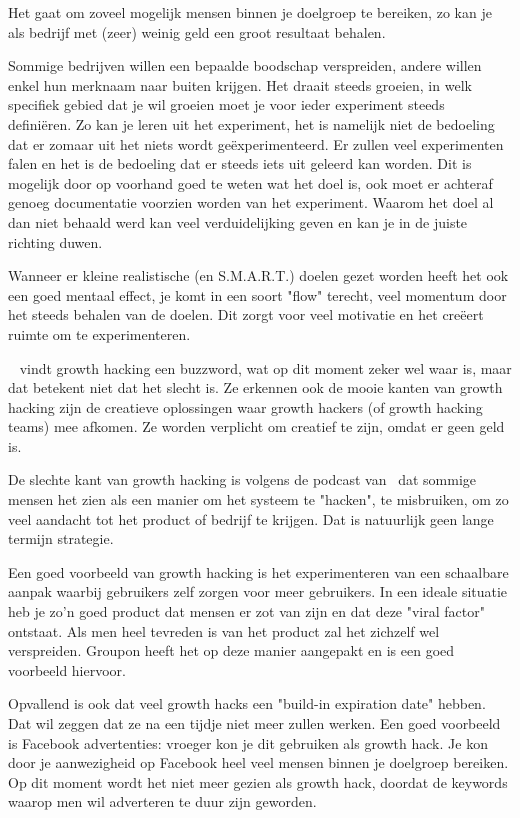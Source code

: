 Het gaat om zoveel mogelijk mensen binnen je doelgroep te bereiken, zo kan je als bedrijf met (zeer) weinig geld een groot resultaat behalen. 

Sommige bedrijven willen een bepaalde boodschap verspreiden, andere willen enkel hun merknaam naar buiten krijgen. Het draait steeds groeien, in welk specifiek gebied dat je wil groeien moet je voor ieder experiment steeds definiëren. Zo kan je leren uit het experiment, het is namelijk niet de bedoeling dat er zomaar uit het niets wordt geëxperimenteerd. Er zullen veel experimenten falen en het is de bedoeling dat er steeds iets uit geleerd kan worden. Dit is mogelijk door op voorhand goed te weten wat het doel is, ook moet er achteraf genoeg documentatie voorzien worden van het experiment. Waarom het doel al dan niet behaald werd kan veel verduidelijking geven en kan je in de juiste richting duwen.

Wanneer er kleine realistische (en S.M.A.R.T.) doelen gezet worden heeft het ook een goed mentaal effect, je komt in een soort "flow" terecht, veel momentum door het steeds behalen van de doelen. Dit zorgt voor veel motivatie en het creëert ruimte om te experimenteren.

~\textcite{fizzle.co2015} vindt growth hacking een buzzword, wat op dit moment zeker wel waar is, maar dat betekent niet dat het slecht is. Ze erkennen ook de mooie kanten van growth hacking zijn de creatieve oplossingen waar growth hackers (of growth hacking teams) mee afkomen. Ze worden verplicht om creatief te zijn, omdat er geen geld is. 

De slechte kant van growth hacking is volgens de podcast van~\autocite{fizzle.co2015} dat sommige mensen het zien als een manier om het systeem te "hacken", te misbruiken, om zo veel aandacht tot het product of bedrijf te krijgen. Dat is natuurlijk geen lange termijn strategie.

Een goed voorbeeld van growth hacking is het experimenteren van een schaalbare aanpak waarbij gebruikers zelf zorgen voor meer gebruikers. In een ideale situatie heb je zo'n goed product dat mensen er zot van zijn en dat deze "viral factor" ontstaat. Als men heel tevreden is van het product zal het zichzelf wel verspreiden. Groupon heeft het op deze manier aangepakt en is een goed voorbeeld hiervoor.

Opvallend is ook dat veel growth hacks een "build-in expiration date" hebben. Dat wil zeggen dat ze na een tijdje niet meer zullen werken. Een goed voorbeeld is Facebook advertenties: vroeger kon je dit gebruiken als growth hack. Je kon door je aanwezigheid op Facebook heel veel mensen binnen je doelgroep bereiken. Op dit moment wordt het niet meer gezien als growth hack, doordat de keywords waarop men wil adverteren te duur zijn geworden.

